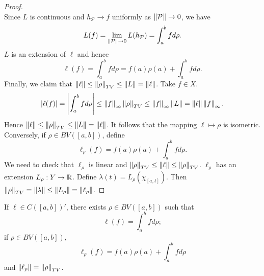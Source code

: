 \begin{proof}
\begin{equation*}
    \end{equation*}
    Since $L$ is continuous and $h_{\mathcal{P}}\to f$ uniformly as 
    $\left\lVert {\mathcal{P}} \right\rVert\to 0$, we have 
    \begin{equation*}
        L(f) = \lim_{\left\lVert {\mathcal{P}} \right\rVert\to 0} L(h_{\mathcal{P}}) 
        = \int_{a}^{b} fd\rho.
    \end{equation*} 
    $L$ is an extension of $\ell$ and hence  
    \begin{equation*}
        \ell(f) = \int_{a}^{b} fd\rho = f(a)\rho(a) + \int_{a}^{b} fd\rho.
    \end{equation*}
    Finally, we claim that $\left\lVert {\ell} \right\rVert\leq\left\lVert {\rho} \right\rVert_{TV}\leq\left\lVert {L} \right\rVert
    =\left\lVert {\ell} \right\rVert$. Take $f\in X$. 
    \begin{equation*}
        \left\lvert {\ell(f)} \right\rvert = \left\lvert {\int_{a}^{b} fd\rho} \right\rvert \leq \left\lVert {f} \right\rVert_{\infty}\left\lVert {\rho} \right\rVert_{TV} 
        \leq \left\lVert {f} \right\rVert_{\infty}\left\lVert {L} \right\rVert = \left\lVert {\ell} \right\rVert\left\lVert {f} \right\rVert_{\infty}.
    \end{equation*}
    Hence $\left\lVert {\ell} \right\rVert\leq\left\lVert {\rho} \right\rVert_{TV}\leq\left\lVert {L} \right\rVert = \left\lVert {\ell} \right\rVert$. 
    It follows that the mapping $\ell\mapsto\rho$ is isometric. Conversely, 
    if $\rho\in BV([a,b])$, define 
    \begin{equation*}
        \ell_{\rho}(f) = f(a)\rho(a) + \int_{a}^{b} fd\rho.
    \end{equation*} 
    We need to check that $\ell_{\rho}$ is linear and 
    $\left\lVert {\rho} \right\rVert_{TV}\leq\left\lVert {\ell} \right\rVert\leq\left\lVert {\rho} \right\rVert_{TV}$. $\ell_\rho$ 
    has an extension $L_\rho:Y\to\mathbb{R}$. Define 
    $\lambda(t) = L_\rho(\chi_{[a,t]})$. Then $\left\lVert {\rho} \right\rVert_{TV}=\left\lVert {\lambda} \right\rVert
    \leq\left\lVert {L_{\rho}} \right\rVert=\left\lVert {\ell_\rho} \right\rVert$.
\end{proof}
\begin{remark}
    If $\ell\in C([a,b])'$, there exists $\rho\in BV([a,b])$ such that 
    \begin{equation*}
        \ell(f) = \int_{a}^{b} fd\rho;
    \end{equation*}
    if $\rho\in BV([a,b])$, 
    \begin{equation*}
        \ell_{\rho}(f) = f(a)\rho(a) + \int_{a}^{b} fd\rho
    \end{equation*}
    and $\left\lVert {\ell_\rho} \right\rVert = \left\lVert {\rho} \right\rVert_{TV}$.
\end{remark}

